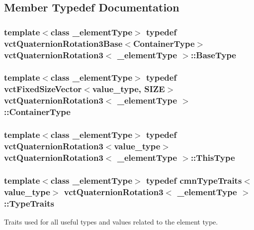 \subsection{Member Typedef Documentation}
\hypertarget{classvct_quaternion_rotation3_aaeef12df3c8d36659b11c3c8df04905f}{
\subsubsection[{Base\-Type}]{\setlength{\rightskip}{0pt plus 5cm}template$<$class \-\_\-element\-Type$>$ typedef {\bf vct\-Quaternion\-Rotation3\-Base}$<${\bf Container\-Type}$>$ {\bf vct\-Quaternion\-Rotation3}$<$ \-\_\-element\-Type $>$\-::{\bf Base\-Type}}}\label{classvct_quaternion_rotation3_aaeef12df3c8d36659b11c3c8df04905f}
\hypertarget{classvct_quaternion_rotation3_a73c9511393f9a59206e3ca57c3564454}{
\subsubsection[{Container\-Type}]{\setlength{\rightskip}{0pt plus 5cm}template$<$class \-\_\-element\-Type$>$ typedef {\bf vct\-Fixed\-Size\-Vector}$<$value\-\_\-type, {\bf S\-I\-Z\-E}$>$ {\bf vct\-Quaternion\-Rotation3}$<$ \-\_\-element\-Type $>$\-::{\bf Container\-Type}}}\label{classvct_quaternion_rotation3_a73c9511393f9a59206e3ca57c3564454}
\hypertarget{classvct_quaternion_rotation3_a8150de55a15eb3adfc8f59a8815ddc70}{
\subsubsection[{This\-Type}]{\setlength{\rightskip}{0pt plus 5cm}template$<$class \-\_\-element\-Type$>$ typedef {\bf vct\-Quaternion\-Rotation3}$<$value\-\_\-type$>$ {\bf vct\-Quaternion\-Rotation3}$<$ \-\_\-element\-Type $>$\-::{\bf This\-Type}}}\label{classvct_quaternion_rotation3_a8150de55a15eb3adfc8f59a8815ddc70}
\hypertarget{classvct_quaternion_rotation3_aa51626a8a27b17262aaabb133ac868e9}{
\subsubsection[{Type\-Traits}]{\setlength{\rightskip}{0pt plus 5cm}template$<$class \-\_\-element\-Type$>$ typedef {\bf cmn\-Type\-Traits}$<$value\-\_\-type$>$ {\bf vct\-Quaternion\-Rotation3}$<$ \-\_\-element\-Type $>$\-::{\bf Type\-Traits}}}\label{classvct_quaternion_rotation3_aa51626a8a27b17262aaabb133ac868e9}
Traits used for all useful types and values related to the element type. 

